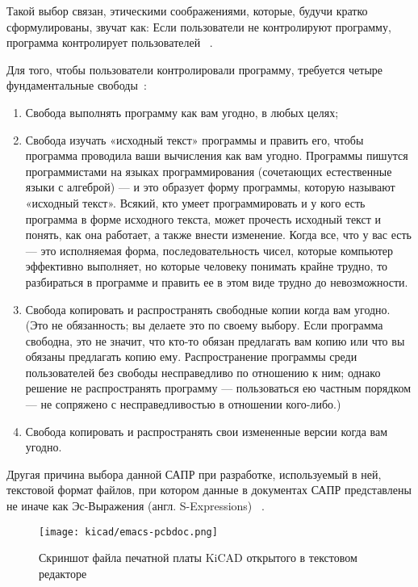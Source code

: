 Такой выбор связан, этическими соображениями, которые, будучи
кратко сформулированы, звучат как:
Если пользователи не контролируют программу,
программа контролирует пользователей ~\cite{unfair-nonfree-programms}.

Для того, чтобы пользователи контролировали программу, требуется
четыре фундаментальные свободы~\cite{unfair-nonfree-programms}:

\begin{enumerate}
\item Свобода выполнять программу как вам угодно, в любых целях;
  
\item Свобода изучать «исходный текст» программы и править его, чтобы
программа проводила ваши вычисления как вам угодно. Программы пишутся
программистами на языках программирования (сочетающих естественные
языки с алгеброй) — и это образует форму программы, которую называют
«исходный текст». Всякий, кто умеет программировать и у кого есть
программа в форме исходного текста, может прочесть исходный текст и
понять, как она работает, а также внести изменение. Когда все, что у
вас есть — это исполняемая форма, последовательность чисел, которые
компьютер эффективно выполняет, но которые человеку понимать крайне
трудно, то разбираться в программе и править ее в этом виде трудно до
невозможности.

\item  Свобода копировать и распространять свободные копии когда вам
угодно. (Это не обязанность; вы делаете это по своему выбору. Если
программа свободна, это не значит, что кто-то обязан предлагать вам
копию или что вы обязаны предлагать копию ему. Распространение
программы среди пользователей без свободы несправедливо по отношению к
ним; однако решение не распространять программу — пользоваться ею
частным порядком — не сопряжено с несправедливостью в отношении
кого-либо.)

\item Свобода копировать и распространять свои измененные версии когда
вам угодно.
\end{enumerate}

Другая причина выбора данной САПР при разработке, используемый в ней,
текстовой формат файлов, при котором данные в документах САПР
представлены не иначе как Эс-Выражения (англ. S-Expressions)
~\cite{kicad-sexpr}.

\begin{figure}[H]
  \centering
  \texttt{[image: kicad/emacs-pcbdoc.png]}
  \caption{Скриншот файла печатной платы KiCAD открытого в текстовом редакторе}
\end{figure}



